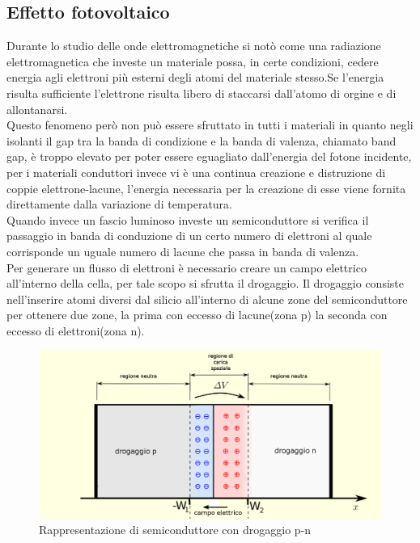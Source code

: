 \subsection{Effetto fotovoltaico}
Durante lo studio delle onde elettromagnetiche si notò come una radiazione elettromagnetica che investe un materiale possa, in certe condizioni, cedere energia agli elettroni più esterni degli atomi del materiale stesso.Se l'energia risulta sufficiente l'elettrone risulta libero di staccarsi dall'atomo di orgine e di allontanarsi.\\
Questo fenomeno però non può essere sfruttato in tutti i materiali in quanto negli isolanti il gap tra la banda di condizione e la banda di valenza, chiamato band gap, è troppo elevato per poter essere eguagliato dall'energia del fotone incidente, per i materiali conduttori invece vi è una continua creazione e distruzione di coppie elettrone-lacune, l'energia necessaria per la creazione di esse viene fornita direttamente dalla variazione di temperatura.\\
Quando invece un fascio luminoso investe un semiconduttore si verifica il passaggio in banda di conduzione di un certo numero di elettroni al quale corrisponde un uguale numero di lacune che passa in banda di valenza.\\
Per generare un flusso di elettroni è necessario creare un campo elettrico all'interno della cella, per tale scopo si sfrutta il drogaggio. Il drogaggio consiste nell'inserire atomi diversi dal silicio all'interno di alcune zone del semiconduttore per ottenere due zone, la prima con eccesso di lacune(zona p) la seconda con eccesso di elettroni(zona n).\\
\begin{figure}[H]
    \centering
    \includegraphics[height=0.5\textwidth]{res/cap 3/drogaggio}
    \caption{Rappresentazione di semiconduttore con drogaggio p-n}
\end{figure}\noindent
